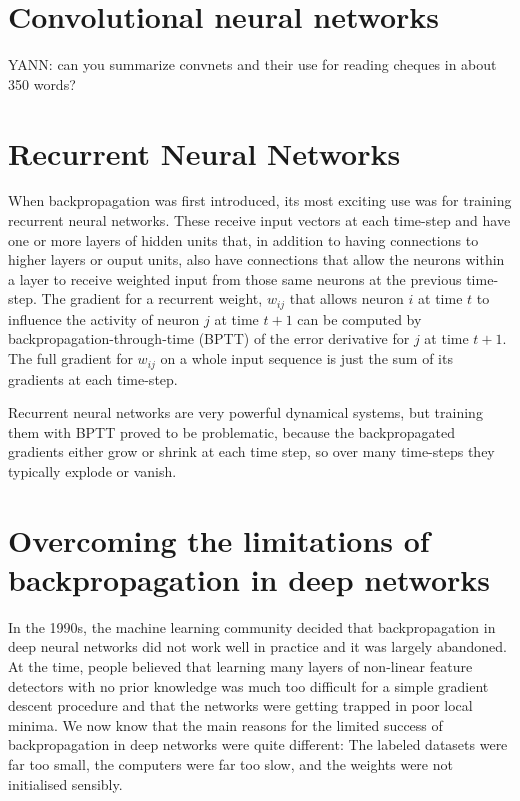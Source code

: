 \documentclass[]{article}
\begin{document}
\section{Convolutional neural networks}


YANN: can you summarize convnets and their use for reading cheques in about
350 words?


\section{Recurrent Neural Networks}

When backpropagation was first introduced, its most exciting use was for
training recurrent neural networks. These receive input vectors at each
time-step and have one or more layers of hidden units that, in addition to
having connections to higher layers or ouput units, also have connections
that allow the neurons within a layer to receive weighted input from those
same neurons at the previous time-step.  The gradient for a recurrent
weight, $w_{ij}$ that allows neuron $i$ at time $t$ to influence the
activity of neuron $j$ at time $t+1$ can be computed by
backpropagation-through-time (BPTT) of the error derivative for $j$ at time
$t+1$. The full gradient for $w_{ij}$ on a whole input sequence is just the
sum of its gradients at each time-step.

Recurrent neural networks are very powerful dynamical systems, but training
them with BPTT proved to be problematic, because the backpropagated
gradients either grow or shrink at each time step, so over many time-steps
they typically explode or vanish\cite{Bengio, schmdhuber}.

\section{Overcoming the limitations of backpropagation in deep networks}

In the 1990s, the machine learning community decided that backpropagation
in deep neural networks did not work well in practice and it was largely
abandoned.  At the time, people believed that learning many layers of
non-linear feature detectors with no prior knowledge was much too difficult
for a simple gradient descent procedure and that the networks were getting
trapped in poor local minima. We now know that the main reasons for the
limited success of backpropagation in deep networks were quite different:
The labeled datasets were far too small, the computers were far too slow,
and the weights were not initialised sensibly.
\end{document}
